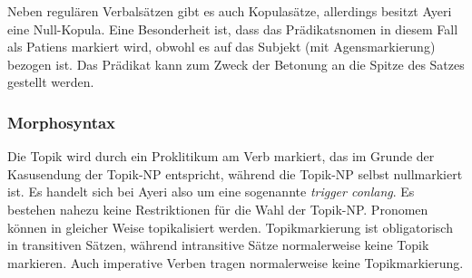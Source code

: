 \documentclass[
	12pt,
	ngerman,
]{scrartcl}
\let\q\textquote
\newcommand{\fw}[1]{\textit{#1}} %
\newcommand{\zwsp}{\mbox{​}} %
\newcommand{\rayr}[2]{\zwsp\smash{{\Tagati #1}} \emph{#2}} %
\begin{document}

Neben regulären Verbalsätzen gibt es auch Kopulasätze, allerdings besitzt Ayeri
eine Null-Kopula. Eine Besonderheit ist, dass das Prädikatsnomen in diesem Fall
als Patiens markiert wird, obwohl es auf das Subjekt (mit Agensmarkierung)
bezogen ist. Das Prädikat kann zum Zweck der Betonung an die Spitze des Satzes
gestellt werden.



\subsubsection{Morphosyntax}
\label{subsubsec:morphsyn}

Die Topik wird durch ein Proklitikum am Verb markiert, das im Grunde der
Kasusendung der Topik-NP entspricht, während die Topik-NP
selbst nullmarkiert ist. Es handelt sich bei Ayeri also um eine sogenannte
\fw{trigger conlang}. Es bestehen nahezu keine Restriktionen für die Wahl der
Topik-NP. Pronomen können in gleicher Weise topikalisiert werden.
Topikmarkierung ist obligatorisch in transitiven Sätzen, während intransitive
Sätze normalerweise keine Topik markieren. Auch imperative Verben tragen
normalerweise keine Topikmarkierung.

\end{document}
